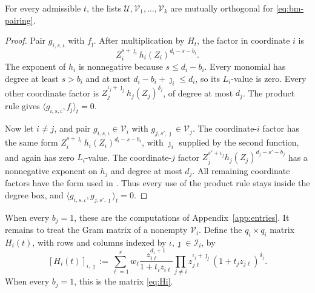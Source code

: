 \begin{lemma}\label{lem:bm-orth}
For every admissible $t$, the lists
$\mathscr U,\mathscr V_1,\ldots,\mathscr V_k$ are mutually orthogonal
for \eqref{eq:bm-pairing}.
\end{lemma}
\begin{proof}
Pair $g_{i,s,\iota}$ with $f_\jmath$. After multiplication by $H_t$,
the factor in coordinate $i$ is
\[
Z_i^{s+\jmath_i}h_i(Z_i)^{d_i-s-b_i}.
\]
The exponent of $h_i$ is nonnegative because $s\le d_i-b_i$. Every
monomial has degree at least $s>b_i$ and at most
$d_i-b_i+\jmath_i\le d_i$, so its $L_i$-value is zero. Every other
coordinate factor is $Z_j^{\iota_j+\jmath_j}h_j(Z_j)^{\delta_j}$, of
degree at most $d_j$. The product rule gives
$\langle g_{i,s,\iota},f_\jmath\rangle_t=0$.

Now let $i\ne j$, and pair $g_{i,s,\iota}\in\mathscr V_i$ with
$g_{j,s',\jmath}\in\mathscr V_j$. The coordinate-$i$ factor has the
same form $Z_i^{s+\jmath_i}h_i(Z_i)^{d_i-s-b_i}$, with $\jmath_i$
supplied by the second function, and again has zero $L_i$-value. The
coordinate-$j$ factor $Z_j^{s'+\iota_j}h_j(Z_j)^{d_j-s'-b_j}$ has a
nonnegative exponent on $h_j$ and degree at most $d_j$. All remaining
coordinate factors have the form used in . Thus
every use of the product rule stays inside the degree box, and
$\langle g_{i,s,\iota},g_{j,s',\jmath}\rangle_t=0$.
\end{proof}

When every $b_j=1$, these are the computations of
Appendix~\ref{app:entries}. It remains to treat the Gram matrix of a
nonempty $\mathscr V_i$. Define the $q_i\times q_i$ matrix $H_i(t)$,
with rows and columns indexed by $\iota,\jmath\in\mathcal I_i$, by
\begin{equation}\label{eq:bm-Hi}
[H_i(t)]_{\iota,\jmath}
:=\sum_{\ell=1}^r w_\ell\frac{z_{i\ell}^{d_i+1}}{1+t_iz_{i\ell}}
\prod_{j\ne i}z_{j\ell}^{\iota_j+\jmath_j}(1+t_jz_{j\ell})^{\delta_j}.
\end{equation}
When every $b_j=1$, this is the matrix \eqref{eq:Hi}.

